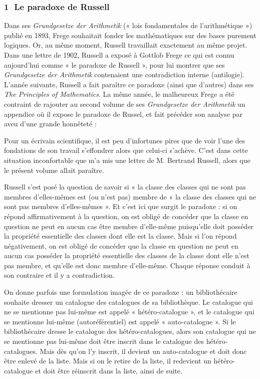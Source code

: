 \subsubsection*{\textcircled{\scriptsize 1} Le paradoxe de Russell}
Dans ses \textit{Grundgesetze der Arithmetik} (« lois fondamentales de l’arithmétique ») publié en 1893, Frege souhaitait fonder les mathématiques sur des bases purement logiques. Or, au même moment, Russell travaillait exactement au même projet. Dans une lettre de 1902, Russell a exposé à Gottlob Frege ce qui est connu aujourd’hui comme « le paradoxe de Russell », pour lui montrer que ses \textit{Grundgesetze der Arithmetik} contenaient une contradiction interne (antilogie). L’année suivante, Russell a fait paraître ce paradoxe (ainsi que d’autres) dans ses \textit{The Principles of Mathematics}. La même année, le malheureux Frege a été contraint de rajouter au second volume de ses \textit{Grundgesetze der Arithmetik} un appendice où il expose le paradoxe de Russel, et fait précéder son analyse par aveu d’une grande honnêteté :

\begin{lecture}{}
Pour un écrivain scientifique, il est peu d’infortunes pires que de voir l’une des fondations de son travail s’effondrer alors que celui-ci s’achève. C’est dans cette situation inconfortable que m’a mis une lettre de M. Bertrand Russell, alors que le présent volume allait paraître.
\end{lecture}

Russell s’est posé la question de savoir si « la classe des classes qui ne sont pas membres d’elles-mêmes est (ou n’est pas) membre de « la classe des classes qui ne sont pas membres d’elles-mêmes ». Et c’est ici que surgit le paradoxe : si on répond affirmativement à la question, on est obligé de concéder que la classe en question ne peut en aucun cas être membre d’elle-même puisqu’elle doit posséder la propriété essentielle des classes dont elle est la classe. Mais si l’on répond négativement, on est obligé de concéder que la classe en question ne peut en aucun cas posséder la propriété essentielle des classes de la classe dont elle n’est pas membre, et qu’elle est donc membre d’elle-même. Chaque réponse conduit à son contraire et il y a contradiction.

On donne parfois une formulation imagée de ce paradoxe : un bibliothécaire souhaite dresser un catalogue des catalogues de sa bibliothèque. Le catalogue qui ne se mentionne pas lui-même est appelé « hétéro-catalogue », et le catalogue qui se mentionne lui-même (autoréférentiel) est appelé « auto-catalogue ». Si le bibliothécaire dresse le catalogue des hétéro-catalogues, alors son catalogue qui ne se mentionne pas lui-même doit être inscrit dans le catalogue des hétéro-catalogues. Mais dès qu’on l’y inscrit, il devient un auto-catalogue et doit donc être enlevé de la liste. Mais si on le retire de la liste, il redevient un hétéro-catalogue et doit être réinscrit dans la liste, ainsi de suite.

